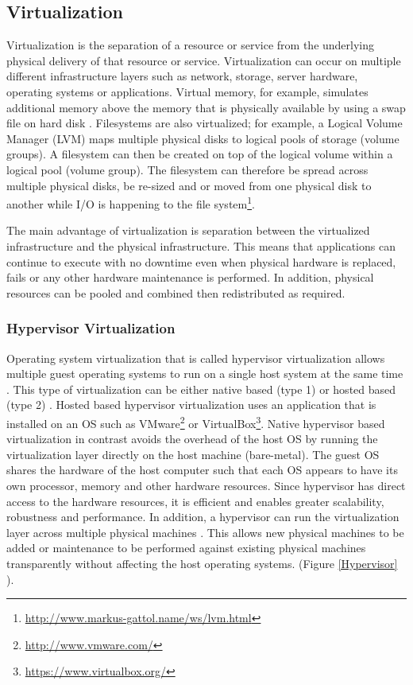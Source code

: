 \documentclass[a4paper,11pt,twoside]{report}
\begin{document}
\subsection{Virtualization} 
Virtualization is the separation of a resource or service from the underlying physical delivery of that resource or service. Virtualization can occur on multiple different infrastructure layers such as network, storage, server hardware, operating systems or applications. Virtual memory, for example, simulates additional memory above the memory that is physically available by using a swap file on hard disk \cite{virtualization}. Filesystems are also virtualized; for example, a Logical Volume Manager (LVM) maps multiple physical disks to logical pools of storage (volume groups). A filesystem can then be created on top of the logical volume within a logical pool (volume group). The filesystem can therefore be spread across multiple physical disks, be re-sized and or moved from one physical disk to another while I/O is happening to the file system\footnote{ \url {http://www.markus-gattol.name/ws/lvm.html}}. 

The main advantage of virtualization is separation between the virtualized infrastructure and the physical infrastructure. This means that applications can continue to execute with no downtime even when physical hardware is replaced, fails or any other hardware maintenance is performed. In addition, physical resources can be pooled and combined then redistributed as required.

\subsubsection*{Hypervisor Virtualization}
Operating system virtualization that is called hypervisor virtualization allows multiple guest operating systems to run on a single host system at the same time \cite{Hypervisors2}. This type of virtualization can be either native based (type 1) or hosted based (type 2) \cite{Hypervisors}. Hosted based hypervisor virtualization uses an application that is installed on an OS such as VMware\footnote{\url{http://www.vmware.com/}} or VirtualBox\footnote{\url {https://www.virtualbox.org/}}. Native hypervisor based virtualization in contrast avoids the overhead of the host OS by running the virtualization layer directly on the host machine (bare-metal). The guest OS shares the hardware of the host computer such that each OS appears to have its own processor, memory and other hardware resources. Since hypervisor has direct access to the hardware resources, it is efficient and enables greater scalability, robustness and performance. In addition, a hypervisor can run the virtualization layer across multiple physical machines \cite{Hypervisors}. This allows new physical machines to be added or maintenance to be performed against existing physical machines transparently without affecting the host operating systems. (Figure \ref{Hypervisor} ).\bigskip
\end{document}
